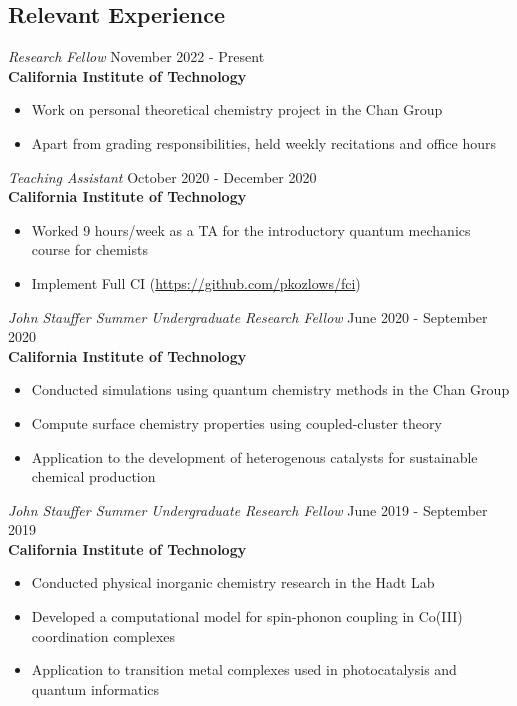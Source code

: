 \documentclass[margin,line]{resume}
\begin{document}
\begin{resume}
\section{\mysidestyle Relevant Experience}
{\sl Research Fellow} \hfill November 2022 - Present\\
\textbf{California Institute of Technology}
\begin{itemize}
\item Work on personal theoretical chemistry project in the Chan Group
\item Apart from grading responsibilities, held weekly recitations and office hours
\end{itemize}
{\sl Teaching Assistant} \hfill October 2020 - December 2020\\
\textbf{California Institute of Technology}
\begin{itemize}
\item Worked 9 hours/week as a TA for the introductory quantum mechanics course for chemists
\item Implement Full CI (\url{https://github.com/pkozlows/fci})
\end{itemize}
{\sl John Stauffer Summer Undergraduate Research Fellow} \hfill June 2020 - September 2020 \\
\textbf{California Institute of Technology}
\begin{itemize}
\item Conducted simulations using quantum chemistry methods in the Chan Group
\item Compute surface chemistry properties using coupled-cluster theory
\item Application to the development of heterogenous catalysts for sustainable chemical production
\end{itemize} 
{\sl John Stauffer Summer Undergraduate Research Fellow} \hfill June 2019 - September 2019 \\
\textbf{California Institute of Technology}
\begin{itemize}
\item Conducted physical inorganic chemistry research in the Hadt Lab
\item Developed a computational model for spin-phonon coupling in Co(III)
coordination complexes
\item Application to transition metal complexes used in photocatalysis and quantum informatics
\end{itemize}

\end{resume}
\end{document}
